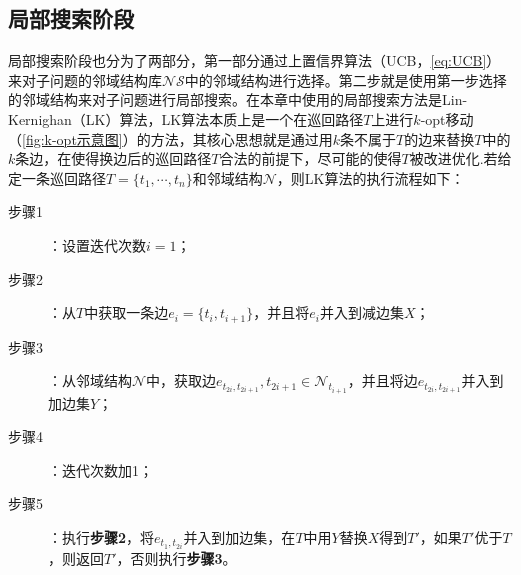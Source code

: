 \subsection{局部搜索阶段}
\label{subsec:NST:算法设计:局部搜索阶段}
局部搜索阶段也分为了两部分，第一部分通过上置信界算法（UCB，\autoref{eq:UCB}）来对子问题的邻域结构库$\mathcal{NS}$中的邻域结构进行选择。第二步就是使用第一步选择的邻域结构来对子问题进行局部搜索。在本章中使用的局部搜索方法是Lin-Kernighan（LK）算法\cite{lin1973effective}，LK算法本质上是一个在巡回路径$T$上进行$k$-opt移动（\autoref{fig:k-opt示意图}）的方法，其核心思想就是通过用$k$条不属于$T$的边来替换$T$中的$k$条边，在使得换边后的巡回路径$T$合法的前提下，尽可能的使得$T$被改进优化.若给定一条巡回路径$T = \{t_1, \cdots, t_n\}$和邻域结构$\mathcal{N}$，则LK算法的执行流程如下：
\begin{description}
    \item[步骤1]：设置迭代次数$i=1$；
    \item[步骤2]：从$T$中获取一条边$e_i = \{t_i, t_{i+1}\}$，并且将$e_i$并入到减边集$X$；
    \item[步骤3]：从邻域结构$\mathcal{N}$中，获取边$e_{t_{2i}, t_{2i+1}}, t_{2i+1} \in \mathcal{N}_{t_{i+1}}$，并且将边$e_{t_{2i}, t_{2i+1}}$并入到加边集$Y$；
    \item[步骤4]：迭代次数加1；
    \item[步骤5]：执行\textbf{步骤2}，将$e_{t_{1}, t_{2i}}$并入到加边集，在$T$中用$Y$替换$X$得到$T'$，如果$T'$优于$T$，则返回$T'$，否则执行\textbf{步骤3}。
\end{description}


